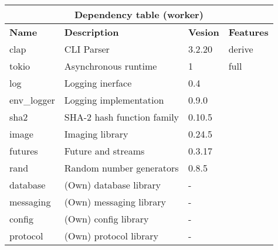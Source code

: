 \documentclass[../documentation.tex]{subfiles}
\begin{document}
\bgroup{}
\def\arraystretch{1.5}
\begin{center}
    \begin{tabular}{ |p{2cm}|p{4cm}|p{1.5cm}|p{2cm}| }
        \hline
        \multicolumn{4}{|c|}{\textbf{Dependency table (worker)}} \\
        \hline
        \textbf{Name} & \textbf{Description} & \textbf{Vesion} & \textbf{Features} \\
        \hline
        clap & CLI Parser & 3.2.20 & derive \\
        \hline
        tokio & Asynchronous runtime & 1 & full \\
        \hline
        log & Logging inerface & 0.4 & \\
        \hline
        env\_logger & Logging implementation & 0.9.0 & \\
        \hline
        sha2 & SHA-2 hash function family & 0.10.5 & \\
        \hline
        image & Imaging library & 0.24.5 & \\
        \hline
        futures & Future and streams & 0.3.17 & \\
        \hline
        rand & Random number generators & 0.8.5 & \\
        \hline
        database & (Own) database library & - & \\
        \hline
        messaging & (Own) messaging library & - & \\
        \hline
        config & (Own) config library & - & \\
        \hline
        protocol & (Own) protocol library & - & \\
        \hline
    \end{tabular}
\end{center}
\egroup{}
\end{document}
